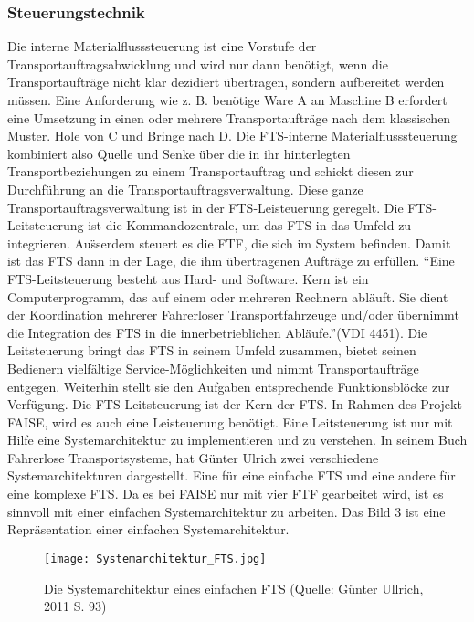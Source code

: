 \subsubsection{Steuerungstechnik}
Die interne Materialflusssteuerung ist eine Vorstufe der Transportauftragsabwicklung und wird nur dann ben\"otigt, wenn die Transportauftr\"age nicht klar dezidiert \"ubertragen, sondern aufbereitet werden m\"ussen. Eine Anforderung wie z. B. ben\"otige Ware A an Maschine B erfordert eine Umsetzung in einen oder mehrere Transportauftr\"age nach dem klassischen Muster. Hole von C und Bringe nach D. Die FTS-interne Materialflusssteuerung kombiniert also Quelle und Senke \"uber die in ihr hinterlegten Transportbeziehungen zu einem Transportauftrag und schickt diesen zur Durchf\"uhrung an die Transportauftragsverwaltung. Diese ganze Transportauftragsverwaltung ist in der FTS-Leisteuerung geregelt. 
Die FTS-Leitsteuerung ist die Kommandozentrale, um das FTS in das Umfeld zu integrieren. Au\"sserdem steuert es die FTF, die sich im System befinden. Damit ist das FTS dann in der 
Lage, die ihm \"ubertragenen Auftr\"age zu erf\"ullen. "`Eine FTS-Leitsteuerung besteht aus Hard- und Software. Kern ist ein Computerprogramm, das auf einem oder mehreren Rechnern abl\"auft. Sie dient der Koordination mehrerer Fahrerloser Transportfahrzeuge und/oder \"ubernimmt die Integration des FTS in die innerbetrieblichen Abl\"aufe."'(VDI 4451). Die Leitsteuerung bringt das FTS in seinem Umfeld zusammen, bietet seinen Bedienern vielf\"altige Service-M\"oglichkeiten und nimmt Transportauftr\"age entgegen. Weiterhin stellt sie den Aufgaben entsprechende Funktionsbl\"ocke zur Verf\"ugung. 
Die FTS-Leitsteuerung ist der Kern der FTS. In Rahmen des Projekt FAISE, wird es auch eine Leisteuerung ben\"otigt. Eine Leitsteuerung ist nur mit Hilfe eine Systemarchitektur zu implementieren und zu verstehen. In seinem Buch Fahrerlose Transportsysteme, hat G\"unter Ulrich zwei verschiedene Systemarchitekturen dargestellt. Eine f\"ur eine einfache FTS und eine andere f\"ur eine komplexe FTS. Da es bei FAISE nur mit vier FTF gearbeitet wird, ist es sinnvoll mit einer einfachen Systemarchitektur zu arbeiten. Das Bild 3 ist eine Repr\"asentation einer einfachen Systemarchitektur.
	\begin{figure}[h!]
		\centering
		\texttt{[image: Systemarchitektur\_FTS.jpg]}
		\caption{Die Systemarchitektur eines einfachen FTS (Quelle: G\"unter Ullrich, 2011 S. 93)}
		\label{Systemarchitektur_FTS}
	\end{figure}

